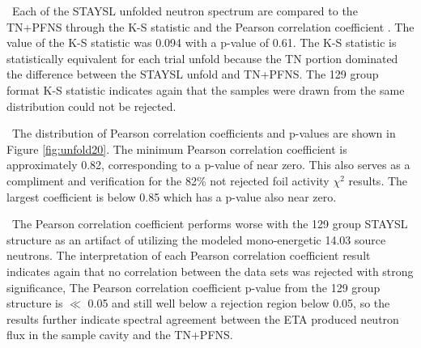 \ Each of the STAYSL unfolded neutron spectrum are compared to the TN+PFNS through the K-S statistic and the Pearson correlation coefficient . 
The value of the K-S statistic was 0.094 with a p-value of 0.61. 
The K-S statistic is statistically equivalent for each trial unfold because the TN portion dominated the difference between the STAYSL unfold and TN+PFNS. 
The 129 group format K-S statistic indicates again that the samples were drawn from the same distribution could not be rejected. 

\ The distribution of Pearson correlation coefficients and p-values are shown in Figure \ref{fig:unfold20}. 
The minimum Pearson correlation coefficient is approximately 0.82, corresponding to a p-value of near zero. This also serves as a compliment and verification for the 82\% not rejected foil activity $\chi^2$ results.
The largest coefficient is below 0.85 which has a p-value also near zero. 

\ The Pearson correlation coefficient performs worse with the 129 group STAYSL structure as an artifact of utilizing the modeled mono-energetic 14.03 source neutrons. 
The interpretation of each Pearson correlation coefficient result indicates again that no correlation between the data sets was rejected with strong significance, 
The Pearson correlation coefficient p-value from the 129 group structure is $\ll$ 0.05 and still well below a rejection region below 0.05, so the results further indicate spectral agreement between the ETA produced neutron flux in the sample cavity and the TN+PFNS.

